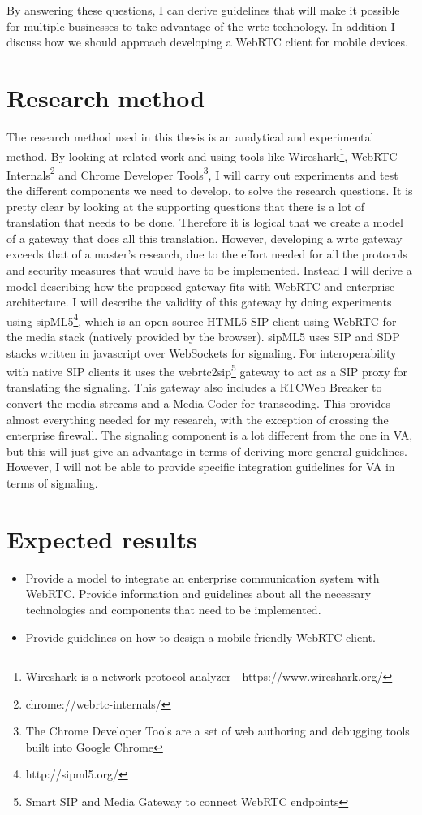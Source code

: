 By answering these questions, I can derive guidelines that will make it possible for multiple businesses to take advantage of the \gls{wrtc} technology. In addition I discuss how we should approach developing a WebRTC client for mobile devices.


\section{Research method}
The research method used in this thesis is an analytical and experimental method. By looking at related work and using tools like Wireshark\footnote{Wireshark is a network protocol analyzer - https://www.wireshark.org/}, WebRTC Internals\footnote{chrome://webrtc-internals/} and Chrome Developer Tools\footnote{The Chrome Developer Tools are a set of web authoring and debugging tools built into Google Chrome}, I will carry out experiments and test the different components we need to develop, to solve the research questions. It is pretty clear by looking at the supporting questions that there is a lot of translation that needs to be done. Therefore it is logical that we create a model of a gateway that does all this translation. However, developing a \gls{wrtc} gateway exceeds that of a master's research, due to the effort needed for all the protocols and security measures that would have to be implemented. Instead I will derive a model describing how the proposed gateway fits with WebRTC and enterprise architecture. I will describe the validity of this gateway by doing experiments using sipML5\footnote{http://sipml5.org/}, which is an open-source HTML5 SIP client using WebRTC for the media stack (natively provided by the browser). sipML5 uses SIP and SDP stacks written in javascript over WebSockets for signaling. For interoperability with native SIP clients it uses the webrtc2sip\footnote{Smart SIP and Media Gateway to connect WebRTC endpoints} gateway to act as a SIP proxy for translating the signaling. This gateway also includes a RTCWeb Breaker to convert the media streams and a Media Coder for transcoding. This provides almost everything needed for my research, with the exception of crossing the enterprise firewall. The signaling component is a lot different from the one in VA, but this will just give an advantage in terms of deriving more general guidelines. However, I will not be able to provide specific integration guidelines for VA in terms of signaling. 

\section{Expected results}

\begin{itemize}
		\item Provide a model to integrate an enterprise communication system with WebRTC. Provide information and guidelines about all the necessary technologies and components that need to be implemented.
		\item Provide guidelines on how to design a mobile friendly WebRTC client.
\end{itemize}
